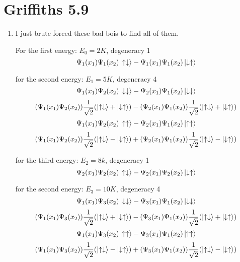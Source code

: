 \documentclass[11pt]{article}
\begin{document}
\newpage

\section*{Griffiths 5.9}
\begin{enumerate}[label=\alph*)]
\item 
I just brute forced these bad bois to find all of them. 

For the first energy: $E_0 = 2K$, degeneracy 1
\[\Psi_1(x_1)\Psi_1(x_2)\ket{\uparrow\downarrow} - \Psi_1(x_1) \Psi_1(x_2)\ket{\downarrow\uparrow}\]

for the second energy: $E_1 = 5K$, degeneracy 4
\[\Psi_1(x_1)\Psi_2(x_2)\ket{\downarrow\downarrow} - \Psi_2(x_1) \Psi_1(x_2)\ket{\downarrow\downarrow}\]
\[(\Psi_1(x_1)\Psi_2(x_2))\frac{1}{\sqrt{2}}(\ket{\uparrow\downarrow} + \ket{\downarrow\uparrow}) - (\Psi_2(x_1)\Psi_1(x_2))\frac{1}{\sqrt{2}}(\ket{\uparrow\downarrow} + \ket{\downarrow\uparrow})\]
\[\Psi_1(x_1)\Psi_2(x_2)\ket{\uparrow\uparrow} - \Psi_2(x_1) \Psi_1(x_2)\ket{\uparrow\uparrow}\]
\[(\Psi_1(x_1)\Psi_2(x_2))\frac{1}{\sqrt{2}}(\ket{\uparrow\downarrow} - \ket{\downarrow\uparrow}) + (\Psi_2(x_1)\Psi_1(x_2))\frac{1}{\sqrt{2}}(\ket{\uparrow\downarrow} - \ket{\downarrow\uparrow})\]

for the third energy: $E_2 = 8k$, degeneracy 1
\[\Psi_2(x_1)\Psi_2(x_2)\ket{\uparrow\downarrow} - \Psi_2(x_1) \Psi_2(x_2)\ket{\downarrow\uparrow}\]

for the second energy: $E_3 = 10K$, degeneracy 4
\[\Psi_1(x_1)\Psi_3(x_2)\ket{\downarrow\downarrow} - \Psi_3(x_1) \Psi_1(x_2)\ket{\downarrow\downarrow}\]
\[(\Psi_1(x_1)\Psi_3(x_2))\frac{1}{\sqrt{2}}(\ket{\uparrow\downarrow} + \ket{\downarrow\uparrow}) - (\Psi_3(x_1)\Psi_1(x_2))\frac{1}{\sqrt{2}}(\ket{\uparrow\downarrow} + \ket{\downarrow\uparrow})\]
\[\Psi_1(x_1)\Psi_3(x_2)\ket{\uparrow\uparrow} - \Psi_3(x_1) \Psi_1(x_2)\ket{\uparrow\uparrow}\]
\[(\Psi_1(x_1)\Psi_3(x_2))\frac{1}{\sqrt{2}}(\ket{\uparrow\downarrow} - \ket{\downarrow\uparrow}) + (\Psi_3(x_1)\Psi_1(x_2))\frac{1}{\sqrt{2}}(\ket{\uparrow\downarrow} - \ket{\downarrow\uparrow})\]

\end{enumerate}

\newpage
\end{document}
